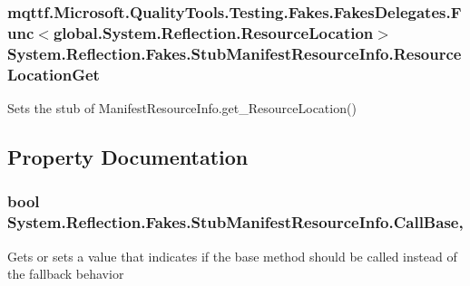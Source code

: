 \hypertarget{class_system_1_1_reflection_1_1_fakes_1_1_stub_manifest_resource_info_ab93490935b8e1e6b0bed3db240453097}{
\subsubsection[{Resource\-Location\-Get}]{\setlength{\rightskip}{0pt plus 5cm}mqttf.\-Microsoft.\-Quality\-Tools.\-Testing.\-Fakes.\-Fakes\-Delegates.\-Func$<$global.\-System.\-Reflection.\-Resource\-Location$>$ System.\-Reflection.\-Fakes.\-Stub\-Manifest\-Resource\-Info.\-Resource\-Location\-Get}}\label{class_system_1_1_reflection_1_1_fakes_1_1_stub_manifest_resource_info_ab93490935b8e1e6b0bed3db240453097}


Sets the stub of Manifest\-Resource\-Info.\-get\-\_\-\-Resource\-Location()



\subsection{Property Documentation}
\hypertarget{class_system_1_1_reflection_1_1_fakes_1_1_stub_manifest_resource_info_a78c3c1373fac5c817f16456fa4f893b6}{
\subsubsection[{Call\-Base}]{\setlength{\rightskip}{0pt plus 5cm}bool System.\-Reflection.\-Fakes.\-Stub\-Manifest\-Resource\-Info.\-Call\-Base\hspace{0.3cm}{\ttfamily [get]}, {\ttfamily [set]}}}\label{class_system_1_1_reflection_1_1_fakes_1_1_stub_manifest_resource_info_a78c3c1373fac5c817f16456fa4f893b6}


Gets or sets a value that indicates if the base method should be called instead of the fallback behavior

